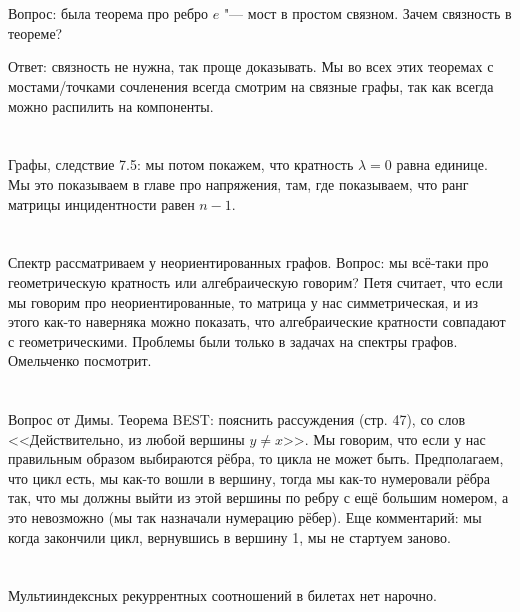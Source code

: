 \section{}
Вопрос: была теорема про ребро $e$ "--- мост в простом связном. Зачем связность в теореме?

Ответ: связность не нужна, так проще доказывать.
Мы во всех этих теоремах с мостами/точками сочленения всегда смотрим на связные графы, так как всегда можно распилить на компоненты.

\section{}
Графы, следствие 7.5: мы потом покажем, что кратность $\lambda=0$ равна единице.
Мы это показываем в главе про напряжения, там, где показываем, что ранг матрицы инцидентности
равен $n-1$.

\section{}
Спектр рассматриваем у неориентированных графов.
Вопрос: мы всё-таки про геометрическую кратность или алгебраическую говорим?
Петя считает, что если мы говорим про неориентированные, то матрица у нас симметрическая,
и из этого как-то наверняка можно показать, что алгебраические кратности совпадают с геометрическими.
Проблемы были только в задачах на спектры графов.
Омельченко посмотрит.

\section{}
Вопрос от Димы.
Теорема BEST: пояснить рассуждения (стр. 47), со слов <<Действительно, из любой вершины $y \neq x$>>.
Мы говорим, что если у нас правильным образом выбираются рёбра, то цикла не может быть.
Предполагаем, что цикл есть, мы как-то вошли в вершину, тогда мы как-то нумеровали рёбра так,
что мы должны выйти из этой вершины по ребру с ещё большим номером, а это невозможно
(мы так назначали нумерацию рёбер).
Еще комментарий: мы когда закончили цикл, вернувшись в вершину 1, мы не стартуем заново.

\section{}
Мультииндексных рекуррентных соотношений в билетах нет нарочно.


